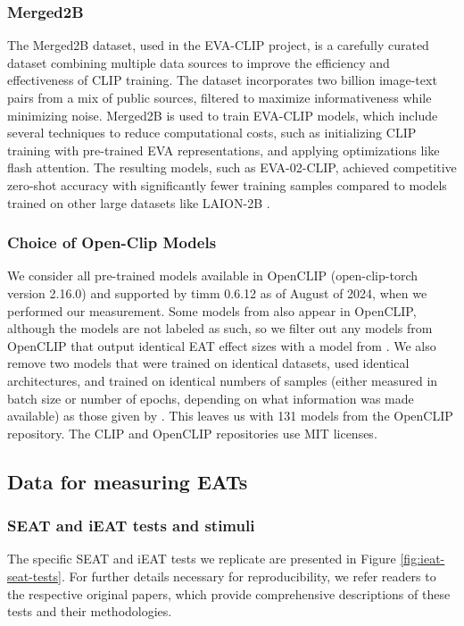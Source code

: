 \subsubsection{Merged2B} The Merged2B dataset, used in the EVA-CLIP project, is a carefully curated dataset combining multiple data sources to improve the efficiency and effectiveness of CLIP training. The dataset incorporates two billion image-text pairs from a mix of public sources, filtered to maximize informativeness while minimizing noise. Merged2B is used to train EVA-CLIP models, which include several techniques to reduce computational costs, such as initializing CLIP training with pre-trained EVA representations, and applying optimizations like flash attention. The resulting models, such as EVA-02-CLIP, achieved competitive zero-shot accuracy with significantly fewer training samples compared to models trained on other large datasets like LAION-2B \cite{sun2023eva}.

\subsubsection{Choice of Open-Clip Models}
We consider all pre-trained models available in OpenCLIP (open-clip-torch version 2.16.0) and supported by timm 0.6.12 as of August of 2024, when we performed our measurement. Some models from \citet{Cherti2023ReproducibleLearning} also appear in OpenCLIP, although the models are not labeled as such, so we filter out any models from OpenCLIP that output identical EAT effect sizes with a model from \citet{Cherti2023ReproducibleLearning}. We also remove two models that were trained on identical datasets, used identical architectures, and trained on identical numbers of samples (either measured in batch size or number of epochs, depending on what information was made available) as those given by \citet{Cherti2023ReproducibleLearning}. This leaves us with 131 models from the OpenCLIP repository. The CLIP and OpenCLIP repositories use MIT licenses.

\subsection{Data for measuring EATs}
\label{apd:eat_data}
\subsubsection{SEAT and iEAT tests and stimuli}

The specific SEAT and iEAT tests we replicate are presented in Figure \ref{fig:ieat-seat-tests}. For further details necessary for reproducibility, we refer readers to the respective original papers, which provide comprehensive descriptions of these tests and their methodologies.


